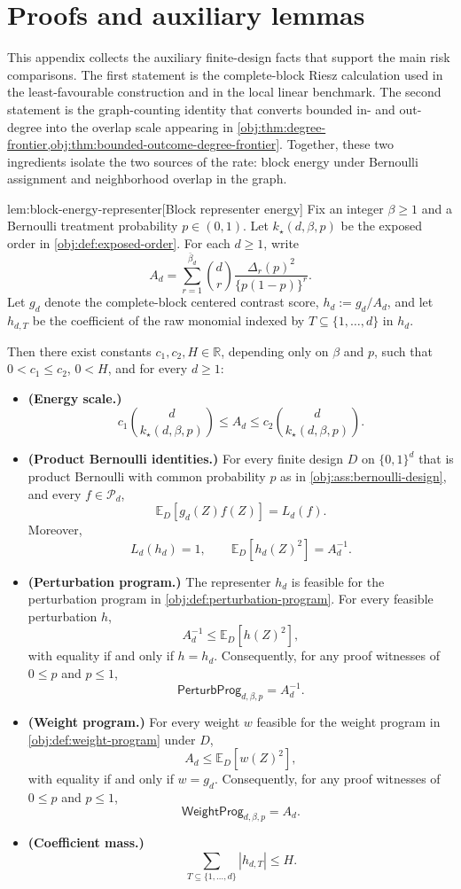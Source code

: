 \section{Proofs and auxiliary lemmas}

This appendix collects the auxiliary finite-design facts that support the main risk comparisons. The first statement is the complete-block Riesz calculation used in the least-favourable construction and in the local linear benchmark. The second statement is the graph-counting identity that converts bounded in- and out-degree into the overlap scale appearing in \cref{obj:thm:degree-frontier,obj:thm:bounded-outcome-degree-frontier}. Together, these two ingredients isolate the two sources of the rate: block energy under Bernoulli assignment and neighborhood overlap in the graph.

\begin{lemmav}{lem:block-energy-representer}[Block representer energy]
Fix an integer \(\beta\ge 1\) and a Bernoulli treatment probability \(p\in(0,1)\). Let \(k_\star(d,\beta,p)\) be the exposed order in \cref{obj:def:exposed-order}. For each \(d\ge 1\), write
\[
A_d
=
\sum_{r=1}^{\bar\beta_d}
\binom d r
\frac{\Delta_r(p)^2}{\{p(1-p)\}^r}.
\]
Let \(g_d\) denote the complete-block centered contrast score, \(h_d:=g_d/A_d\), and let \(h_{d,T}\) be the coefficient of the raw monomial indexed by \(T\subseteq\{1,\ldots,d\}\) in \(h_d\).

Then there exist constants \(c_1,c_2,H\in\mathbb R\), depending only on \(\beta\) and \(p\), such that \(0<c_1\le c_2\), \(0<H\), and for every \(d\ge 1\):
\begin{itemize}
\item \textbf{(Energy scale.)}
\[
c_1\binom d {k_\star(d,\beta,p)}
\le
A_d
\le
c_2\binom d {k_\star(d,\beta,p)}.
\]
\item \textbf{(Product Bernoulli identities.)} For every finite design \(D\) on \(\{0,1\}^d\) that is product Bernoulli with common probability \(p\) as in \cref{obj:ass:bernoulli-design}, and every \(f\in\mathcal P_d\),
\[
\mathbb E_D[g_d(Z)f(Z)]
=
L_d(f).
\]
Moreover,
\[
L_d(h_d)=1,
\qquad
\mathbb E_D[h_d(Z)^2]=A_d^{-1}.
\]
\item \textbf{(Perturbation program.)} The representer \(h_d\) is feasible for the perturbation program in \cref{obj:def:perturbation-program}. For every feasible perturbation \(h\),
\[
A_d^{-1}\le \mathbb E_D[h(Z)^2],
\]
with equality if and only if \(h=h_d\). Consequently, for any proof witnesses of \(0\le p\) and \(p\le 1\),
\[
\mathsf{PerturbProg}_{d,\beta,p}=A_d^{-1}.
\]
\item \textbf{(Weight program.)} For every weight \(w\) feasible for the weight program in \cref{obj:def:weight-program} under \(D\),
\[
A_d\le \mathbb E_D[w(Z)^2],
\]
with equality if and only if \(w=g_d\). Consequently, for any proof witnesses of \(0\le p\) and \(p\le 1\),
\[
\mathsf{WeightProg}_{d,\beta,p}=A_d.
\]
\item \textbf{(Coefficient mass.)}
\[
\sum_{T\subseteq\{1,\ldots,d\}} |h_{d,T}|
\le
H.
\]
\end{itemize}
\end{lemmav}

